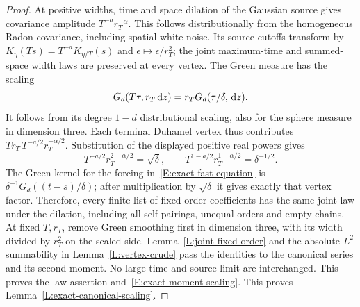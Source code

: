 \begin{proof}
  At positive widths, time and space dilation of the Gaussian source gives
  covariance amplitude $T^{-a}r_T^{-\alpha}$. This follows distributionally from
  the homogeneous Radon covariance, including spatial white noise. Its source
  cutoffs transform by $K_\eta(Ts) = T^{-a}K_{\eta/T}(s)$ and
  $\epsilon\mapsto\epsilon/r_T^2$; the joint maximum-time and summed-space width
  laws are preserved at every vertex. The Green measure has the scaling
  \[
    G_d(T\tau,r_T\,\mathrm{d} z)
    =r_TG_d(\tau/\delta,\,\mathrm{d} z).
  \]
  It follows from its degree $1-d$ distributional scaling, also for the sphere
  measure in dimension three. Each terminal Duhamel vertex thus contributes
  $Tr_T\,T^{-a/2}r_T^{-\alpha/2}$. Substitution of the displayed positive real
  powers gives
  \[
    T^{-a/2}r_T^{2-\alpha/2}=\sqrt\delta,\qquad
    T^{1-a/2}r_T^{1-\alpha/2}=\delta^{-1/2}.
  \]
  The Green kernel for the forcing in~\eqref{E:exact-fast-equation} is
  $\delta^{-1}G_d((t-s)/\delta)$; after multiplication by $\sqrt\delta$ it gives
  exactly that vertex factor. Therefore, every finite list of fixed-order
  coefficients has the same joint law under the dilation, including all
  self-pairings, unequal orders and empty chains. At fixed $T,r_T$, remove Green
  smoothing first in dimension three, with its width divided by $r_T^2$ on the
  scaled side. Lemma~\ref{L:joint-fixed-order} and the absolute $L^2$
  summability in Lemma~\ref{L:vertex-crude} pass the identities to the canonical
  series and its second moment. No large-time and source limit are interchanged.
  This proves the law assertion and~\eqref{E:exact-moment-scaling}. This proves
  Lemma~\ref{L:exact-canonical-scaling}.
\end{proof}
